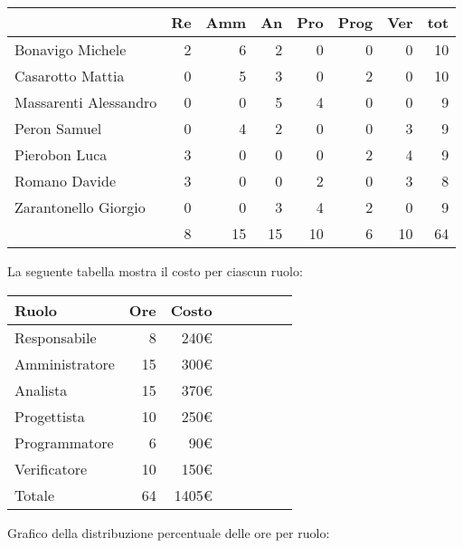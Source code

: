 \begin{table}[H]
    \begin{tabularx}{\linewidth}{X|rrrrrrr}
    \rowcolor{gray!30}& Re & Amm & An & Pro & Prog & Ver & tot \\
    \hline
    Bonavigo Michele                        & 2 & 6 & 2 & 0 & 0 & 0 & 10 \\
    \rowcolor{gray!10}Casarotto Mattia      & 0 & 5 & 3 & 0 & 2 & 0 & 10 \\
    Massarenti Alessandro                   & 0 & 0 & 5 & 4 & 0 & 0 & 9  \\
    \rowcolor{gray!10}Peron Samuel          & 0 & 4 & 2 & 0 & 0 & 3 & 9 \\
    Pierobon Luca                           & 3 & 0 & 0 & 0 & 2 & 4 & 9  \\
    \rowcolor{gray!10}Romano Davide         & 3 & 0 & 0 & 2 & 0 & 3 & 8 \\
    Zarantonello Giorgio                    & 0 & 0 & 3 & 4 & 2 & 0 & 9 \\
    \hline                                  & 8 & 15 & 15 & 10 & 6 & 10 & 64 \\ 
    \end{tabularx}
\end{table}

La seguente tabella mostra il costo per ciascun ruolo:
\begin{table}[H]
    \begin{tabularx}{\linewidth}{X|rrrrrrr}
    \rowcolor{gray!30}Ruolo & Ore & Costo \\
    \hline
    Responsabile                            & 8 & 240€ \\
    \rowcolor{gray!10}Amministratore        & 15 & 300€ \\
    Analista                                & 15 & 370€ \\
    \rowcolor{gray!10}Progettista           & 10 & 250€ \\
    Programmatore                           & 6 & 90€ \\
    \rowcolor{gray!10}Verificatore          & 10 & 150€ \\
    \hline Totale                           & 64 & 1405€ \\ 
    \end{tabularx}
\end{table}

Grafico della distribuzione percentuale delle ore per ruolo:
\begin{center}
\end{center}

